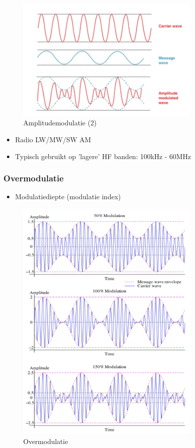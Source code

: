 \documentclass{article}
\begin{document}
\begin{figure}[H]
    \centering
    \includegraphics[width=0.8\textwidth]{Screenshot_20200302_120147.png}
    \caption{Amplitudemodulatie (2)}
\end{figure}

\begin{itemize}
    \item Radio LW/MW/SW AM
    \item Typisch gebruikt op 'lagere' HF banden: 100kHz - 60MHz
\end{itemize}

\subsubsection{Overmodulatie}
\begin{itemize}
    \item Modulatiediepte (modulatie index)
\end{itemize}

\begin{figure}[H]
    \centering
    \includegraphics[width=0.8\textwidth]{Screenshot_20200302_120354.png}
    \caption{Overmodulatie}
\end{figure}
\end{document}
